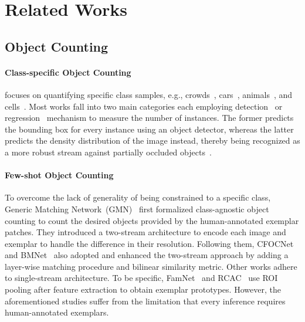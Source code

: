 \section{Related Works}


\subsection{Object Counting}
\paragraph{Class-specific Object Counting}
focuses on quantifying specific class samples, e.g., crowds~\cite{h0, h1, h2, h3}, cars~\cite{2016cars, 2017drone}, animals~\cite{2016animal}, and cells~\cite{2018cell}.
Most works fall into two main categories each employing detection~\cite{d0, 2017drone, d1} or regression~\cite{r0, r1, r2, r3} mechanism to measure the number of instances.
The former predicts the bounding box for every instance using an object detector, whereas the latter predicts the density distribution of the image instead, thereby being recognized as a more robust stream against partially occluded objects~\cite{2019GMN}.



\paragraph{Few-shot Object Counting}
To overcome the lack of generality of being constrained to a specific class, 
Generic Matching Network~(GMN)~\cite{2019GMN} first formalized class-agnostic object counting to count the desired objects provided by the human-annotated exemplar patches.
They introduced a two-stream architecture to encode each image and exemplar to handle the difference in their resolution. 
Following them, CFOCNet~\cite{2021CFOCNet} and BMNet~\cite{2022BMNet} also adopted and enhanced the two-stream approach by adding a layer-wise matching procedure and bilinear similarity metric.
Other works adhere to single-stream architecture. 
To be specific, FamNet~\cite{2021FAMNet} and RCAC~\cite{gong2022class} use ROI pooling after feature extraction to obtain exemplar prototypes.
However, the aforementioned studies suffer from the limitation that every inference requires human-annotated exemplars.



